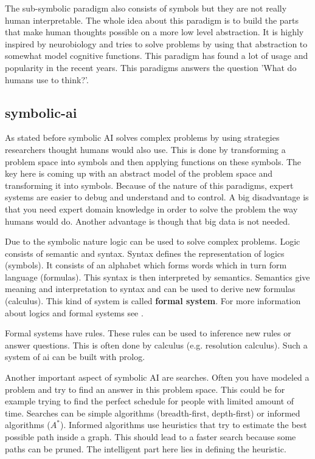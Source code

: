 \documentclass[jou,apacite]{apa6}
\begin{document}
The sub-symbolic paradigm also consists of symbols but they are not really human interpretable. The whole idea about this paradigm is to build the parts that make human thoughts possible on a more low level abstraction. It is highly inspired by neurobiology and tries to solve problems by using that abstraction to somewhat model cognitive functions. This paradigm has found a lot of usage and popularity in the recent years. This paradigms answers the question 'What do humans use to think?'.

\subsection{\gls{symbolic-ai}}
As stated before symbolic AI solves complex problems by using strategies researchers thought humans would also use. This is done by transforming a problem space into symbols and then applying functions on these symbols. The key here is coming up with an abstract model of the problem space and transforming it into symbols. Because of the nature of this paradigms, expert systems are easier to debug and understand and to control. A big disadvantage is that you need expert domain knowledge in order to solve the problem the way humans would do. Another advantage is though that big data is not needed.

Due to the symbolic nature logic can be used to solve complex problems. Logic consists of semantic and syntax. Syntax defines the representation of logics (symbols). It consists of an alphabet which forms words which in turn form language (formulas). This syntax is then interpreted by semantics. Semantics give meaning and interpretation to syntax and can be used to derive new formulas (calculus). This kind of system is called \textbf{formal system}. For more information about logics and formal systems see \cite{Richardson2006}. 

Formal systems have rules. These rules can be used to inference new rules or answer questions. This is often done by calculus (e.g. resolution calculus). Such a system of \gls{ai} can be built with \gls{prolog}.

Another important aspect of symbolic AI are searches. Often you have modeled a problem and try to find an answer in this problem space. This could be for example trying to find the perfect schedule for people with limited amount of time. Searches can be simple algorithms (breadth-first, depth-first) or informed algorithms ($A^*$). Informed algorithms use heuristics that try to estimate the best possible path inside a graph. This should lead to a faster search because some paths can be pruned. The intelligent part here lies in defining the heuristic.
\end{document}
